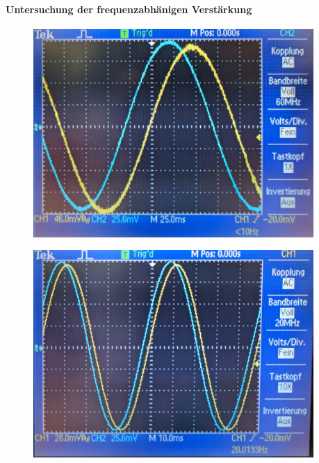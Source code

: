 \documentclass[12pt,english,ngerman]{scrartcl}
\begin{document}

\paragraph{Untersuchung der frequenzabhänigen Verstärkung}

\begin{figure}[H]
  \centering
    \includegraphics[width=0.95\textwidth]{./figures/integrator/5hz.jpg}
  \caption{}
  \label{fig:mess_integrator_5hz}
\end{figure}

\begin{figure}[H]
  \centering
    \includegraphics[width=0.95\textwidth]{./figures/integrator/20hz.jpg}
  \caption{}
  \label{fig:mess_integrator_20hz}
\end{figure}
\end{document}

